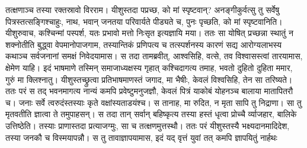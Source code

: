 \vakya तत्क्षणाञ्च तस्या रक्तस्रावो विरराम।
\vakya यीशुस्तदा पप्रच्छ, को मां स्पृष्टवान्? अनङ्गीकुर्वत्सु तु सर्वेषु पित्रस्तत्सङ्गिश्चाहुः, नाथ, भवान् जनतया परिवार्यते पीड्यते च, पुनः पृच्छति, को मां स्पृष्टवानिति।
\vakya यीशुरुवाच, कश्चिन्मां पस्पर्श, यतः प्रभावो मत्तो निःसृत इत्यज्ञायि मया।
\vakya ततः सा योषित् प्रच्छन्ना स्थातुं न शक्नोतीति बुद्ध्वा वेपमानोपाजगाम, तस्यान्तिकं प्रणिपत्य च तत्स्पर्शनस्य कारणं सद्य आरोग्यलाभस्य कथाञ्च सर्वजनानां समक्षं निवेदयामास।
\vakya स तदा तामब्रवीत्, आश्वसिहि, वत्से, तव विश्वासस्त्वां तारयामास, क्षेमेण याहि।
\vakya इदं भाषमाणे तस्मिन् समाजाध्यक्षस्य गृहात् कश्चिदागत्य तमाह, भवतो दुहितो दुहिता ममार, गुरुं मा क्लिश्नातु।
\vakya यीशुस्तच्छ्रुत्वा प्रतिभाषमाणस्तं जगाद, मा भैषीः, केवलं विश्वसिहि, तेन सा तरिष्यते।
\vakya ततः परं स तद् भवनमागत्य नान्यं कमपि प्रवेष्टुमनुजज्ञौ, केवलं पित्रं याकोबं योहनञ्च बालाया मातापितरौ च।
\vakya जनाः सर्वे त्वरुदंस्तस्याः कृते वक्षांस्यताडयंश्च। स तानाह, मा रुदित, न मृता सापि तु निद्राणा।
\vakya सा तु मृतवतीति ज्ञात्वा ते तमुपाहसन्।
\vakya स तदा तान् सर्वान् बहिष्कृत्य तस्या हस्तं धृत्वा प्रोच्चै र्व्याजहार, बालिके उत्तिष्ठेति।
\vakya तस्याः प्राणास्तदा प्रत्याजग्मुः, सा च तत्क्षणमुत्तस्थौ।
\vakya ततः परं यीशुस्तस्यै भक्ष्यदानमादिदेश, तस्या जनकौ च विस्मयापन्नौ। स तु तावाज्ञापयामास, इदं यद् वृत्तं युवां तत् कमपि ज्ञापयितुं नार्हथः\eoc